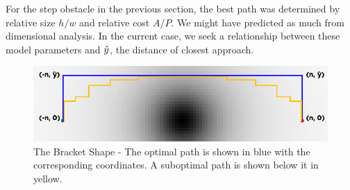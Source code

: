 For the step obstacle in the previous section, the best path was determined by relative size $h/w$ and relative cost $A/P$. We might have predicted as much from dimensional analysis. In the current case, we seek a relationship between these model parameters and $\hat{y}$, the distance of closest approach.

\begin{figure}
\includegraphics[width=\columnwidth]{graphix/bracket.png}
\caption{The Bracket Shape - The optimal path is shown in blue with the corresponding coordinates. A suboptimal path is shown below it in yellow. }
\label{fig:bracket}
\end{figure}
